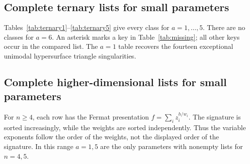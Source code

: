 \clearpage
\subsection{Complete ternary lists for small parameters}
Tables~\ref{tab:ternary1}--\ref{tab:ternary5} give every class for $a=1,\ldots,5$. There are no classes for $a=6$. An asterisk marks a key in Table~\ref{tab:missing}; all other keys occur in the compared list. The $a=1$ table recovers the fourteen exceptional unimodal hypersurface triangle singularities.

\begin{table}[htbp]
\centering\small

\caption{$n=3$, $a=1$: fourteen classes.}
\label{tab:ternary1}
\end{table}
\begin{table}[htbp]
\centering\small

\caption{$n=3$, $a=2$: six classes.}
\label{tab:ternary2}
\end{table}
\begin{table}[htbp]
\centering\small

\caption{$n=3$, $a=3$: eight classes.}
\label{tab:ternary3}
\end{table}
\begin{table}[htbp]
\centering\small

\caption{$n=3$, $a=4$: eight classes.}
\label{tab:ternary4}
\end{table}
\begin{table}[htbp]
\centering\small

\caption{$n=3$, $a=5$: twenty-one classes.}
\label{tab:ternary5}
\end{table}

\clearpage
\subsection{Complete higher-dimensional lists for small parameters}
For $n\geq4$, each row has the Fermat presentation $f=\sum_i z_i^{h/w_i}$. The signature is sorted increasingly, while the weights are sorted independently. Thus the variable exponents follow the order of the weights, not the displayed order of the signature. In this range $a=1,5$ are the only parameters with nonempty lists for $n=4,5$.

\begin{table}[htbp]
\centering\small

\caption{$n=4$ (dimension three): all classes for $1\leq a\leq6$.}
\label{tab:higher4}
\end{table}
\begin{table}[htbp]
\centering\small

\caption{$n=5$ (dimension four): all classes for $1\leq a\leq6$.}
\label{tab:higher5}
\end{table}

